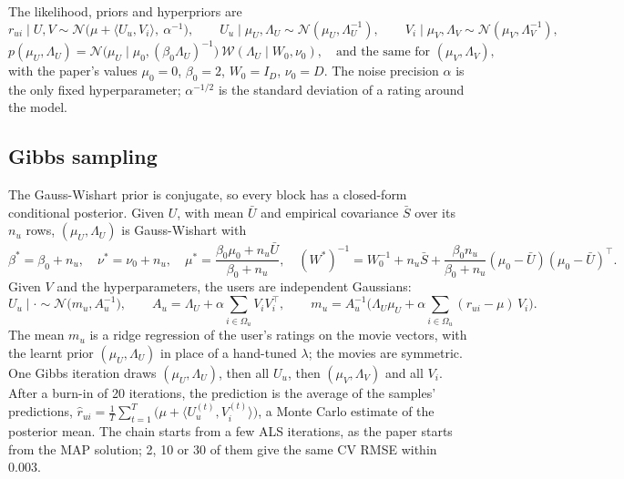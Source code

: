\documentclass[11pt,a4paper]{article}
\newcommand{\N}{\mathcal{N}}
\newcommand{\rhat}{\hat r}
\begin{document}
The likelihood, priors and hyperpriors are
\[
r_{ui} \mid U, V \sim \N\!\big(\mu + \langle U_u, V_i\rangle,\ \alpha^{-1}\big), \qquad
U_u \mid \mu_U, \Lambda_U \sim \N(\mu_U, \Lambda_U^{-1}), \qquad V_i \mid \mu_V, \Lambda_V \sim \N(\mu_V, \Lambda_V^{-1}),
\]
\[
p(\mu_U, \Lambda_U) = \N\!\big(\mu_U \mid \mu_0, (\beta_0\Lambda_U)^{-1}\big)\ \mathcal{W}(\Lambda_U \mid W_0, \nu_0),
\quad\text{and the same for } (\mu_V, \Lambda_V),
\]
with the paper's values $\mu_0 = 0$, $\beta_0 = 2$, $W_0 = I_D$, $\nu_0 = D$. The noise precision $\alpha$ is the
only fixed hyperparameter; $\alpha^{-1/2}$ is the standard deviation of a rating around the model.

\subsection{Gibbs sampling}
The Gauss-Wishart prior is conjugate, so every block has a closed-form conditional posterior. Given $U$, with
mean $\bar U$ and empirical covariance $\bar S$ over its $n_u$ rows, $(\mu_U, \Lambda_U)$ is Gauss-Wishart with
\[
\beta^* = \beta_0 + n_u,\quad \nu^* = \nu_0 + n_u,\quad
\mu^* = \frac{\beta_0\mu_0 + n_u\bar U}{\beta_0 + n_u},\quad
(W^*)^{-1} = W_0^{-1} + n_u\bar S + \frac{\beta_0 n_u}{\beta_0+n_u}(\mu_0-\bar U)(\mu_0-\bar U)^\top .
\]
Given $V$ and the hyperparameters, the users are independent Gaussians:
\[
U_u \mid \cdot \sim \N\!\big(m_u, A_u^{-1}\big),\qquad
A_u = \Lambda_U + \alpha\!\sum_{i\in\Omega_u}\! V_i V_i^\top,\qquad
m_u = A_u^{-1}\Big(\Lambda_U\mu_U + \alpha\!\sum_{i\in\Omega_u}\!(r_{ui}-\mu)\,V_i\Big).
\]
The mean $m_u$ is a ridge regression of the user's ratings on the movie vectors, with the learnt prior
$(\mu_U, \Lambda_U)$ in place of a hand-tuned $\lambda$; the movies are symmetric. One Gibbs iteration draws
$(\mu_U,\Lambda_U)$, then all $U_u$, then $(\mu_V,\Lambda_V)$ and all $V_i$. After a burn-in of 20 iterations,
the prediction is the average of the samples' predictions,
$\rhat_{ui} = \frac{1}{T}\sum_{t=1}^{T}\big(\mu + \langle U^{(t)}_u, V^{(t)}_i\rangle\big)$, a Monte Carlo
estimate of the posterior mean. The chain starts from a few ALS iterations, as the paper starts from the MAP
solution; 2, 10 or 30 of them give the same CV RMSE within $0.003$.
\end{document}
